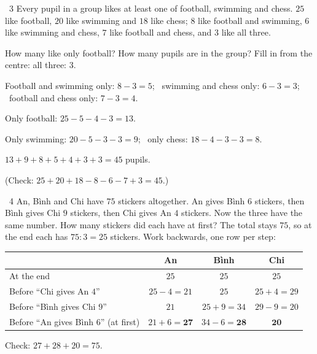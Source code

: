 \gap
\begin{exbox}{\ExWord\ 3}
Every pupil in a group likes at least one of football, swimming and chess. $25$ like football, $20$ like swimming and $18$ like chess; $8$ like football and swimming, $6$ like swimming and chess, $7$ like football and chess, and $3$ like all three.\par
{} How many like only football? \quad {} How many pupils are in the group?
\guide
Fill in from the centre: all three: $3$.\par
Football and swimming only: $8-3=5$; \ swimming and chess only: $6-3=3$; \ football and chess only: $7-3=4$.\par
{} Only football: $25-5-4-3=13$.\par
Only swimming: $20-5-3-3=9$; \ only chess: $18-4-3-3=8$.
\begin{center}
\end{center}
 $13+9+8+5+4+3+3=45$ pupils.\par
(Check: $25+20+18-8-6-7+3=45$.)
\end{exbox}
\gap
\begin{exbox}{\ExWord\ 4}
An, Bình and Chi have $75$ stickers altogether. An gives Bình $6$ stickers, then Bình gives Chi $9$ stickers, then Chi gives An $4$ stickers. Now the three have the same number. How many stickers did each have at first?
\guide
The total stays $75$, so at the end each has $75:3=25$ stickers. Work backwards, one row per step:
\begin{center}
\renewcommand{\arraystretch}{1.25}
\begin{tabular}{|l|c|c|c|}
\hline
 & An & Bình & Chi\\\hline
At the end & $25$ & $25$ & $25$\\\hline
Before ``Chi gives An $4$'' & $25-4=21$ & $25$ & $25+4=29$\\\hline
Before ``Bình gives Chi $9$'' & $21$ & $25+9=34$ & $29-9=20$\\\hline
Before ``An gives Bình $6$'' (at first) & $21+6=\mathbf{27}$ & $34-6=\mathbf{28}$ & $\mathbf{20}$\\\hline
\end{tabular}
\end{center}
Check: $27+28+20=75$.
\end{exbox}
\gap
